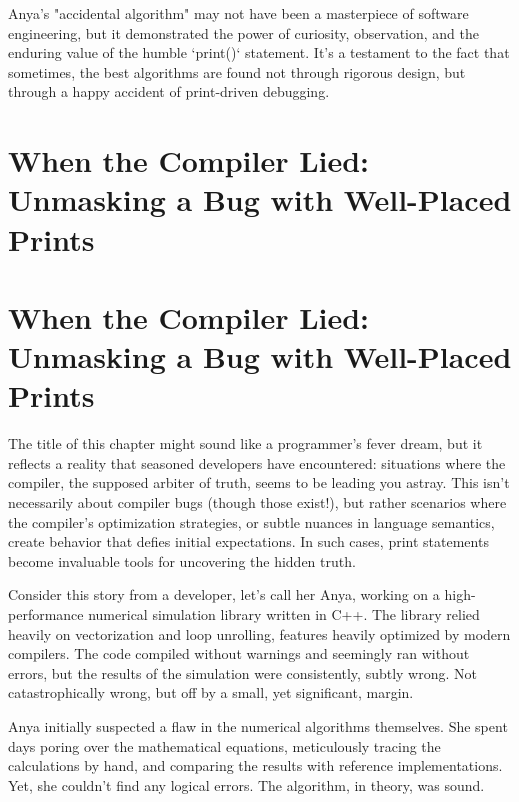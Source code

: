 \documentclass{article}
\begin{document}
{{{{Anya's "accidental algorithm" may not have been a masterpiece of software engineering, but it demonstrated the power of curiosity, observation, and the enduring value of the humble `print()` statement. It's a testament to the fact that sometimes, the best algorithms are found not through rigorous design, but through a happy accident of print-driven debugging.

\newpage

\section*{When the Compiler Lied: Unmasking a Bug with Well-Placed Prints} %
\label{chapter-8-5-When_the_Compiler_Lied__Unmasking_a_Bug}

\section*{When the Compiler Lied: Unmasking a Bug with Well-Placed Prints}

The title of this chapter might sound like a programmer's fever dream, but it reflects a reality that seasoned developers have encountered: situations where the compiler, the supposed arbiter of truth, seems to be leading you astray. This isn't necessarily about compiler bugs (though those exist!), but rather scenarios where the compiler's optimization strategies, or subtle nuances in language semantics, create behavior that defies initial expectations. In such cases, print statements become invaluable tools for uncovering the hidden truth.

Consider this story from a developer, let's call her Anya, working on a high-performance numerical simulation library written in C++. The library relied heavily on vectorization and loop unrolling, features heavily optimized by modern compilers. The code compiled without warnings and seemingly ran without errors, but the results of the simulation were consistently, subtly wrong. Not catastrophically wrong, but off by a small, yet significant, margin.

Anya initially suspected a flaw in the numerical algorithms themselves. She spent days poring over the mathematical equations, meticulously tracing the calculations by hand, and comparing the results with reference implementations. Yet, she couldn't find any logical errors. The algorithm, in theory, was sound.

}}}}
\end{document}
